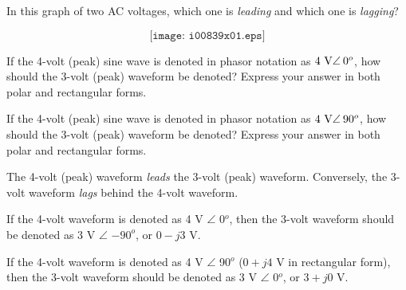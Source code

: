 

In this graph of two AC voltages, which one is {\it leading} and which one is {\it lagging}?

$$\texttt{[image: i00839x01.eps]}$$

If the 4-volt (peak) sine wave is denoted in phasor notation as $4 \hbox{ V} \angle \> 0^o$, how should the 3-volt (peak) waveform be denoted?  Express your answer in both polar and rectangular forms.

\vskip 5pt

If the 4-volt (peak) sine wave is denoted in phasor notation as $4 \hbox{ V} \angle \> 90^o$, how should the 3-volt (peak) waveform be denoted?  Express your answer in both polar and rectangular forms.







The 4-volt (peak) waveform {\it leads} the 3-volt (peak) waveform.  Conversely, the 3-volt waveform {\it lags} behind the 4-volt waveform.

\vskip 5pt

If the 4-volt waveform is denoted as 4 V $\angle$ 0$^o$, then the 3-volt waveform should be denoted as 3 V $\angle$ $-90^o$, or $0 - j3$ V.

\vskip 5pt

If the 4-volt waveform is denoted as 4 V $\angle$ 90$^o$ ($0 + j4$ V in rectangular form), then the 3-volt waveform should be denoted as 3 V $\angle$ 0$^o$, or $3 + j0$ V.











